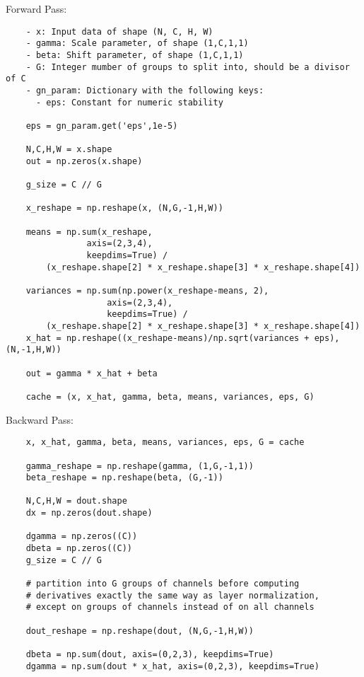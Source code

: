 \documentclass[12pt,letter]{article}
\begin{document}
\begin{enumerate}
  \pagebreak

  Forward Pass:
\begin{verbatim}
    - x: Input data of shape (N, C, H, W)
    - gamma: Scale parameter, of shape (1,C,1,1)
    - beta: Shift parameter, of shape (1,C,1,1)
    - G: Integer mumber of groups to split into, should be a divisor of C
    - gn_param: Dictionary with the following keys:
      - eps: Constant for numeric stability

    eps = gn_param.get('eps',1e-5)

    N,C,H,W = x.shape
    out = np.zeros(x.shape)

    g_size = C // G

    x_reshape = np.reshape(x, (N,G,-1,H,W))

    means = np.sum(x_reshape, 
                axis=(2,3,4), 
                keepdims=True) / 
        (x_reshape.shape[2] * x_reshape.shape[3] * x_reshape.shape[4])

    variances = np.sum(np.power(x_reshape-means, 2), 
                    axis=(2,3,4), 
                    keepdims=True) /
        (x_reshape.shape[2] * x_reshape.shape[3] * x_reshape.shape[4])
    x_hat = np.reshape((x_reshape-means)/np.sqrt(variances + eps), (N,-1,H,W))
    
    out = gamma * x_hat + beta

    cache = (x, x_hat, gamma, beta, means, variances, eps, G)
\end{verbatim}
  
  \pagebreak
  
  Backward Pass:
\begin{verbatim}
    x, x_hat, gamma, beta, means, variances, eps, G = cache

    gamma_reshape = np.reshape(gamma, (1,G,-1,1))
    beta_reshape = np.reshape(beta, (G,-1))
    
    N,C,H,W = dout.shape
    dx = np.zeros(dout.shape)

    dgamma = np.zeros((C))
    dbeta = np.zeros((C))
    g_size = C // G

    # partition into G groups of channels before computing 
    # derivatives exactly the same way as layer normalization, 
    # except on groups of channels instead of on all channels
    
    dout_reshape = np.reshape(dout, (N,G,-1,H,W))
    
    dbeta = np.sum(dout, axis=(0,2,3), keepdims=True)
    dgamma = np.sum(dout * x_hat, axis=(0,2,3), keepdims=True)


\end{verbatim}
\end{enumerate}
\end{document}
